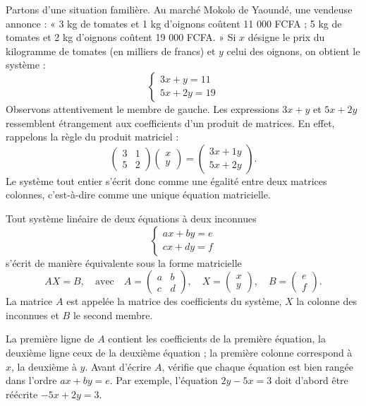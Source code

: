 \documentclass[11pt]{article}
\newcommand{\cle}[1]{{\popxbold\color{popdark}#1}}
\begin{document}
Partons d'une situation familière. Au marché Mokolo de Yaoundé, une vendeuse annonce : « 3 kg de tomates et 1 kg d'oignons coûtent 11 000 FCFA ; 5 kg de tomates et 2 kg d'oignons coûtent 19 000 FCFA. » Si $x$ désigne le prix du kilogramme de tomates (en milliers de francs) et $y$ celui des oignons, on obtient le système :
\[
\begin{cases} 3x + y = 11 \\ 5x + 2y = 19 \end{cases}
\]
Observons attentivement le membre de gauche. Les expressions $3x + y$ et $5x + 2y$ ressemblent étrangement aux coefficients d'un produit de matrices. En effet, rappelons la règle du produit matriciel :
\[
\begin{pmatrix} 3 & 1 \\ 5 & 2 \end{pmatrix}\begin{pmatrix} x \\ y \end{pmatrix} = \begin{pmatrix} 3x + 1y \\ 5x + 2y \end{pmatrix}.
\]
Le système tout entier s'écrit donc comme une égalité entre deux matrices colonnes, c'est-à-dire comme une unique équation matricielle.

\begin{definition}
Tout système linéaire de deux équations à deux inconnues
\[
\begin{cases} ax + by = e \\ cx + dy = f \end{cases}
\]
s'écrit de manière équivalente sous la forme matricielle
\[
AX = B, \quad \text{avec} \quad A = \begin{pmatrix} a & b \\ c & d \end{pmatrix}, \quad X = \begin{pmatrix} x \\ y \end{pmatrix}, \quad B = \begin{pmatrix} e \\ f \end{pmatrix}.
\]
La matrice $A$ est appelée la \cle{matrice des coefficients} du système, $X$ la \cle{colonne des inconnues} et $B$ le \cle{second membre}.
\end{definition}

\begin{attention}
La première ligne de $A$ contient les coefficients de la première équation, la deuxième ligne ceux de la deuxième équation ; la première colonne correspond à $x$, la deuxième à $y$. Avant d'écrire $A$, vérifie que chaque équation est bien rangée dans l'ordre $ax + by = e$. Par exemple, l'équation $2y - 5x = 3$ doit d'abord être réécrite $-5x + 2y = 3$.
\end{attention}
\end{document}
